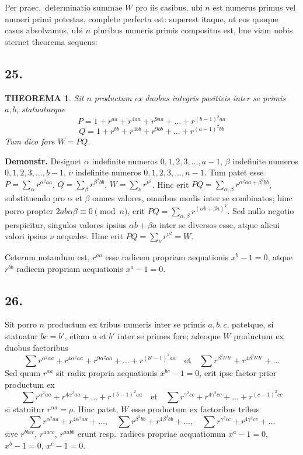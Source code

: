 \documentclass[12pt,a4paper]{article}
\theoremstyle{plain}
\newtheorem{theorem}{THEOREMA}[section]
\begin{document}
\medskip
Per praec.\ determinatio summae $W$ pro iis casibus, ubi $n$ est numerus primus vel numeri primi potestas, complete perfecta est: superest itaque, ut eos quoque casus absolvamus, ubi $n$ pluribus numeris primis compositus est, hue viam nobis sternet theorema sequens:

\subsection*{25.}

\begin{theorem}
Sit $n$ productum ex duobus integris positivis inter se primis $a, b$, statuaturque
\[
P = 1 + r^{aa} + r^{4aa} + r^{9aa} + \ldots + r^{(b-1)^2 aa}
\]
\[
Q = 1 + r^{bb} + r^{4bb} + r^{9bb} + \ldots + r^{(a-1)^2 bb}
\]
Tum dico fore $W = PQ$.
\end{theorem}

\noindent\textbf{Demonstr.} Designet $\alpha$ indefinite numeros $0, 1, 2, 3, \ldots, a-1$, $\beta$ indefinite numeros $0, 1, 2, 3, \ldots, b-1$, $\nu$ indefinite numeros $0, 1, 2, 3, \ldots, n-1$. Tum patet esse $P = \sum_{\alpha} r^{\alpha^2 aa}$, $Q = \sum_{\beta} r^{\beta^2 bb}$, $W = \sum_{\nu} r^{\nu^2}$. Hinc erit $PQ = \sum_{\alpha, \beta} r^{\alpha^2 aa + \beta^2 bb}$, substituendo pro $\alpha$ et $\beta$ omnes valores, omnibus modis inter se combinatos; hinc porro propter $2ab\alpha\beta \equiv 0 \pmod{n}$, erit $PQ = \sum_{\alpha, \beta} r^{(\alpha b + \beta a)^2}$. Sed nullo negotio perspicitur, singulos valores ipsius $\alpha b + \beta a$ inter se diversos esse, atque alicui valori ipsius $\nu$ aequales. Hinc erit $PQ = \sum_{\nu} r^{\nu^2} = W$.

Ceterum notandum est, $r^{aa}$ esse radicem propriam aequationis $x^b - 1 = 0$, atque $r^{bb}$ radicem propriam aequationis $x^a - 1 = 0$.

\subsection*{26.}

Sit porro $n$ productum ex tribus numeris inter se primis $a, b, c$, patetque, si statuatur $bc = b'$, etiam $a$ et $b'$ inter se primes fore; adeoque $W$ productum ex duobus factoribus
\[
\sum r^{\alpha^2 aa} + r^{4\alpha^2 aa} + r^{9\alpha^2 aa} + \ldots + r^{(b'-1)^2 aa} \quad \text{et} \quad \sum r^{\beta^2 b'b'} + r^{4\beta^2 b'b'} + \ldots
\]
Sed quum $r^{aa}$ sit radix propria aequationis $x^{bc} - 1 = 0$, erit ipse factor prior productum ex
\[
\sum r^{\alpha^2 aa} + r^{4\alpha^2 aa} + \ldots + r^{(b-1)^2 aa} \quad \text{et} \quad \sum r^{\gamma^2 cc} + r^{4\gamma^2 cc} + \ldots + r^{(c-1)^2 cc}
\]
si statuitur $r^{\alpha a} = \rho$. Hinc patet, $W$ esse productum ex factoribus tribus
\[
\sum r^{\alpha^2 aa} + r^{4\alpha^2 aa} + \ldots, \quad \sum r^{\beta^2 bb} + r^{4\beta^2 bb} + \ldots, \quad \sum r^{\gamma^2 cc} + r^{4\gamma^2 cc} + \ldots
\]
sive $r^{bbcc}$, $r^{aacc}$, $r^{aabb}$ erunt resp.\ radices propriae aequationum $x^a - 1 = 0$, $x^b - 1 = 0$, $x^c - 1 = 0$.
\end{document}

